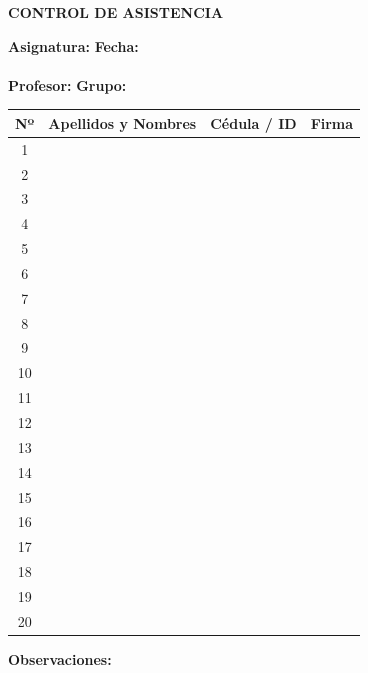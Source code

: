\documentclass[a4paper,12pt]{article}
\begin{document}
\pagestyle{empty}

\begin{center}
    {\Large \textbf{CONTROL DE ASISTENCIA}} \\
    \vspace{0.5cm}
\end{center}

\noindent
\textbf{Asignatura:} \hrulefill \quad \textbf{Fecha:} \underline{\hspace{3cm}} \\
\vspace{0.2cm} \\
\noindent
\textbf{Profesor:} \hrulefill \quad \textbf{Grupo:} \underline{\hspace{3cm}}

\vspace{0.5cm}

\renewcommand{\arraystretch}{1.8} %
\begin{center}
    \begin{tabular}{|c|p{7cm}|p{3.5cm}|p{4cm}|}
        \hline
        \textbf{Nº} & \textbf{Apellidos y Nombres} & \textbf{Cédula / ID} & \textbf{Firma} \\
        \hline
        1 & & & \\ \hline
        2 & & & \\ \hline
        3 & & & \\ \hline
        4 & & & \\ \hline
        5 & & & \\ \hline
        6 & & & \\ \hline
        7 & & & \\ \hline
        8 & & & \\ \hline
        9 & & & \\ \hline
        10 & & & \\ \hline
        11 & & & \\ \hline
        12 & & & \\ \hline
        13 & & & \\ \hline
        14 & & & \\ \hline
        15 & & & \\ \hline
        16 & & & \\ \hline
        17 & & & \\ \hline
        18 & & & \\ \hline
        19 & & & \\ \hline
        20 & & & \\ \hline
    \end{tabular}
\end{center}

\vspace{1cm}
\noindent
\textbf{Observaciones:} \hrulefill
\end{document}
